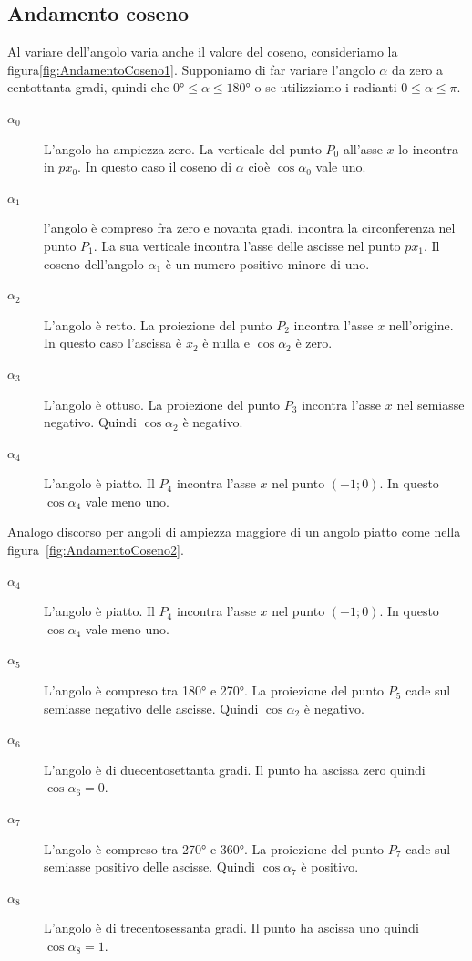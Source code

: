 \subsection{Andamento coseno}
\label{sec:andamentocoseno}
Al variare dell'angolo varia anche il valore del coseno, consideriamo la figura\nobs\vref{fig:AndamentoCoseno1}. Supponiamo di far variare l'angolo $\alpha$ da zero a centottanta gradi, quindi che $\ang{0}\leq\alpha\leq\ang{180}$ o se utilizziamo i radianti $0\leq\alpha\leq\pi$. 
\begin{description}
	\item[$\alpha_0$] L'angolo ha ampiezza zero. La verticale del punto $P_0$ all'asse $x$ lo incontra in $px_0$. In questo caso il coseno di $\alpha$ cioè $\cos\alpha_0$ vale uno.
	\item [$\alpha_1$] l'angolo è compreso fra zero e novanta gradi, incontra la circonferenza nel punto $P_1$. La sua verticale incontra l'asse delle ascisse nel punto $px_1$. Il coseno dell'angolo $\alpha_1$ è un numero positivo minore di uno.
	\item [$\alpha_2$] L'angolo  è retto. La proiezione del punto $P_2$ incontra l'asse $x$ nell'origine. In questo caso l'ascissa è $x_2$ è   nulla e $\cos\alpha_2$ è zero. 
	\item [$\alpha_3$]  L'angolo è ottuso. La proiezione del punto $P_3$ incontra  l'asse $x$ nel semiasse negativo. Quindi $\cos\alpha_2$ è negativo.
	\item [$\alpha_4$] L'angolo  è  piatto. Il  $P_4$ incontra l'asse $x$ nel punto $(-1;0)$. In questo  $\cos\alpha_4$ vale meno uno.
\end{description}
Analogo discorso per angoli di ampiezza  maggiore di un angolo  piatto come nella figura~\vref{fig:AndamentoCoseno2}.
\begin{description}
	\item [$\alpha_4$] L'angolo è piatto. Il  $P_4$ incontra l'asse $x$ nel punto $(-1;0)$. In questo  $\cos\alpha_4$ vale meno uno.
	\item [$\alpha_5$] L'angolo è compreso tra \ang{180} e \ang{270}. La proiezione del punto $P_5$ cade sul semiasse negativo delle ascisse. Quindi $\cos\alpha_2$ è negativo.
	\item [$\alpha_6$] L'angolo è di duecentosettanta gradi. Il punto ha ascissa zero quindi  $\cos\alpha_6=0$.
	\item [$\alpha_7$] L'angolo è compreso tra \ang{270} e \ang{360}. La proiezione del punto $P_7$ cade sul semiasse positivo delle ascisse. Quindi $\cos\alpha_7$ è positivo.
	\item [$\alpha_8$] L'angolo è di trecentosessanta gradi. Il punto ha ascissa uno quindi  $\cos\alpha_8=1$.
\end{description}

